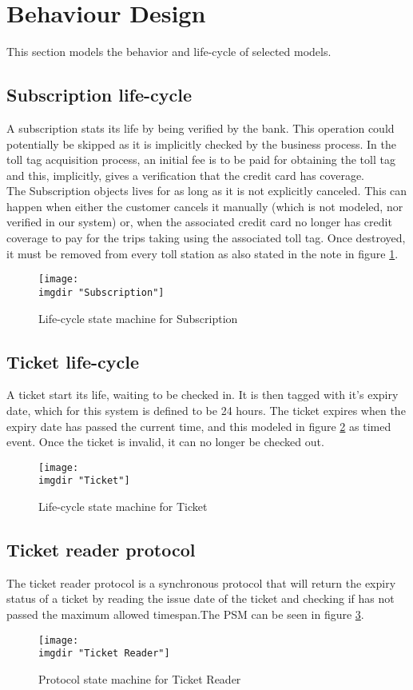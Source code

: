 \section{Behaviour Design}
This section models the behavior and life-cycle of selected models.

\subsection{Subscription life-cycle}
A subscription stats its life by being verified by the bank. This operation could potentially be skipped as it is implicitly checked by the business process. In the toll tag acquisition process, an initial fee is to be paid for obtaining the toll tag and this, implicitly, gives a verification that the credit card has coverage.\\
The Subscription objects lives for as long as it is not explicitly canceled. This can happen when either the customer cancels it manually (which is not modeled, nor verified in our system) or, when the associated credit card no longer has credit coverage to pay for the trips taking using the associated toll tag. Once destroyed, it must be removed from every toll station as also stated in the note in figure \ref{fig:lsm:subscription}.
\begin{figure}
  \centering
  \texttt{[image: \\imgdir "Subscription"]}
  \caption{Life-cycle state machine for Subscription}
  \label{fig:lsm:subscription}
\end{figure}

\subsection{Ticket life-cycle}
A ticket start its life, waiting to be checked in. It is then tagged with it's expiry date, which for this system is defined to be 24 hours. The ticket expires when the expiry date has passed the current time, and this modeled in figure \ref{fig:lsm:ticket} as timed event. Once the ticket is invalid, it can no longer be checked out.
\begin{figure}
  \centering
  \texttt{[image: \\imgdir "Ticket"]}
  \caption{Life-cycle state machine for Ticket}
  \label{fig:lsm:ticket}
\end{figure}

\subsection{Ticket reader protocol}
The ticket reader protocol is a synchronous protocol that will return the expiry status of a ticket by reading the issue date of the ticket and checking if has not passed the maximum allowed timespan.The PSM can be seen in figure \ref{fig:lsm:ticket_reader}.
\begin{figure}
  \centering
  \texttt{[image: \\imgdir "Ticket Reader"]}
  \caption{Protocol state machine for Ticket Reader}
  \label{fig:lsm:ticket_reader}
\end{figure}

